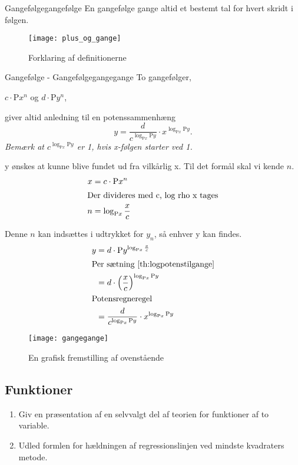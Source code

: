 \documentclass{article}
\newcommand{\Rho}{\mathrm{P}}
\begin{document}
\begin{definition}{Gangefølge}{gangefølge}
	En gangefølge gange altid et bestemt tal for hvert skridt i følgen.
\end{definition}

\begin{figure}[H]
	\centering
	\caption{Forklaring af definitionerne}
	\texttt{[image: plus\_og\_gange]}
	\label{plus_og_gange}
\end{figure}

\begin{theorem}{Gangefølge - Gangefølge}{gangegange}
	To gangefølger,
	\begin{center}
		$c\cdot \Rho x^n$ og $d\cdot \Rho y^n$,
	\end{center}
	giver altid anledning til en potenssammenhæng
	\[
		y = \frac{d}{c^{\log_{\Rho x}{\Rho y}}}\cdot x^{\log_{\Rho x}{\Rho y}}.
	\]
	\textit{Bemærk at $c^{\log_{\Rho x}{\Rho y}}$ er 1, hvis x-følgen starter ved 1.}
\end{theorem}

y ønskes at kunne blive fundet ud fra vilkårlig x. Til det formål skal vi kende
$n$.
\begin{align*}
	x &= c\cdot \Rho x^n\\
\intertext{Der divideres med c, log rho x tages}
	n &= \log_{\Rho x}{\frac{x}{c}}
\end{align*}

Denne $n$ kan indsættes i udtrykket for $y_n$, så enhver y kan findes.
\begin{align*}
	y &= d\cdot \Rho y^{\log_{\Rho x}{\frac{x}{c}}}\\
\intertext{Per sætning \ref{th:logpotenstilgange}}
	&= d\cdot \left(\frac{x}{c}\right)^{\log_{\Rho x}{\Rho y}}\\
\intertext{Potensregneregel}
	&= \frac{d}{c^{\log_{\Rho x}{\Rho y}}}\cdot x^{\log_{\Rho x}{\Rho y}}
\end{align*}

\begin{figure}[H]
	\centering
	\caption{En grafisk fremstilling af ovenstående}
	\texttt{[image: gangegange]}
	\label{gangegange}
\end{figure}

\begin{tcolorbox}
	\section{Funktioner}
	\tcblower
	\begin{enumerate}
		\item Giv en præsentation af en selvvalgt del af teorien for funktioner af to variable.
		\item Udled formlen for hældningen af regressionslinjen ved mindste kvadraters metode.
	\end{enumerate}
\end{tcolorbox}
\end{document}
